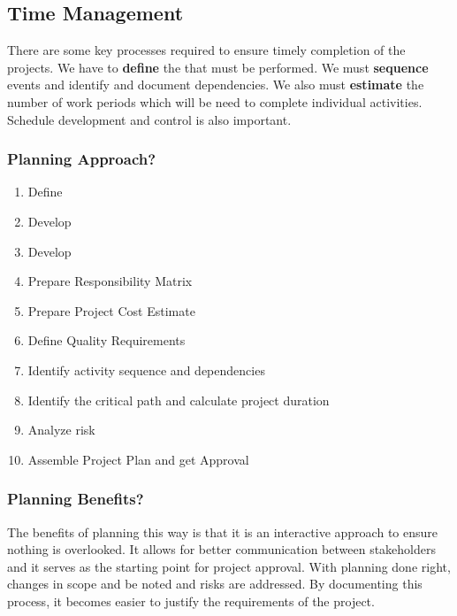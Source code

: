 \documentclass[english, 11pt]{article}
\begin{document}
\subsection{Time Management}

There are some key processes required to ensure timely completion of the projects. We have to {\bf define} the  that must be performed. We must {\bf sequence} events and identify and document dependencies. We also must {\bf estimate} the number of work periods which will be need to complete individual activities. Schedule development and control is also important.

\subsubsection{Planning Approach?}

\begin{enumerate}
    \item Define 
    \item Develop 
    \item Develop 
    \item Prepare Responsibility Matrix
    \item Prepare Project Cost Estimate
    \item Define Quality Requirements
    \item Identify activity sequence and dependencies
    \item Identify the critical path and calculate project duration
    \item Analyze risk
    \item Assemble Project Plan and get Approval
\end{enumerate}

\subsubsection{Planning Benefits?}

The benefits of planning this way is that it is an interactive approach to ensure nothing is overlooked. It allows for better communication between stakeholders and it serves as the starting point for project approval. With planning done right, changes in scope and be noted and risks are addressed. By documenting this process, it becomes easier to justify the requirements of the project. \\
\end{document}
